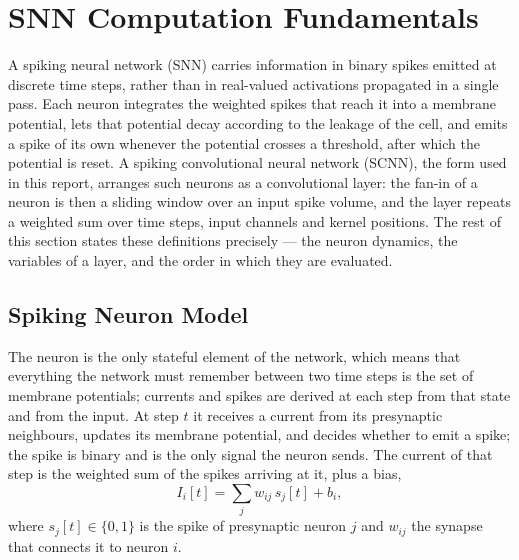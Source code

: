 
\section{SNN Computation Fundamentals}
\label{sec:1-fund}

A spiking neural network (SNN) carries information in binary spikes emitted at
discrete time steps, rather than in real-valued activations propagated in a
single pass. Each neuron integrates the weighted spikes that reach it into a
membrane potential, lets that potential decay according to the leakage of the
cell, and emits a spike of its own whenever the potential crosses a threshold,
after which the potential is reset. A spiking convolutional neural network
(SCNN), the form used in this report, arranges such neurons as a convolutional
layer: the fan-in of a neuron is then a sliding window over an input spike
volume, and the layer repeats a weighted sum over time steps, input channels and
kernel positions. The rest of this section states these definitions precisely
--- the neuron dynamics, the variables of a layer, and the order in which they
are evaluated.

\subsection{Spiking Neuron Model}
\label{sec:1-neuron}

The neuron is the only stateful element of the network, which means that
everything the network must remember between two time steps is the set of
membrane potentials; currents and spikes are derived at each step from that
state and from the input. At step $t$ it receives a current from its presynaptic
neighbours, updates its membrane potential, and decides whether to emit a spike;
the spike is binary and is the only signal the neuron sends. The current of that
step is the weighted sum of the spikes arriving at it, plus a bias,
\begin{equation}
I_i[t] = \sum_{j} w_{ij}\,s_j[t] + b_i ,
\label{eq:1-current}
\end{equation}
where $s_j[t]\in\{0,1\}$ is the spike of presynaptic neuron $j$ and $w_{ij}$ the
synapse that connects it to neuron $i$.

